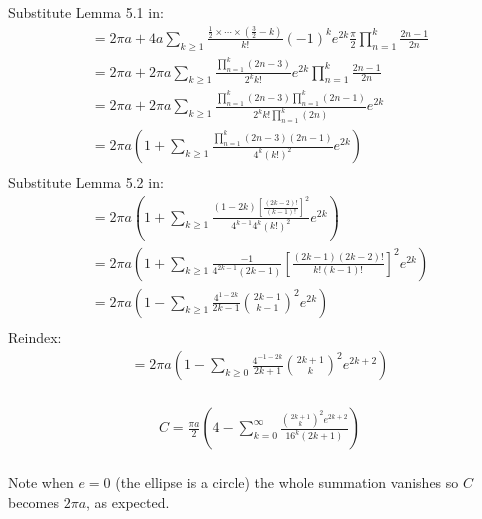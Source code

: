 \documentclass{article}
\begin{document}
Substitute Lemma 5.1 in:
\begin{equation*}
\begin{split}
	= 2\pi a + 4a\sum_{k\geq 1}\frac{\frac{1}{2}\times\cdots\times(\frac{3}{2}-k)}{k!}(-1)^ke^{2k}\frac{\pi}{2}\prod_{n=1}^k\frac{2n-1}{2n}\\
	= 2\pi a + 2\pi a\sum_{k\geq 1}\frac{\prod_{n=1}^k(2n-3)}{2^kk!}e^{2k}\prod_{n=1}^k\frac{2n-1}{2n}\\
	= 2\pi a + 2\pi a\sum_{k\geq 1}\frac{\prod_{n=1}^k(2n-3)\prod_{n=1}^k(2n-1)}{2^kk!\prod_{n=1}^k(2n)}e^{2k}\\
	= 2\pi a\left(1+\sum_{k\geq 1}\frac{\prod_{n=1}^k(2n-3)(2n-1)}{4^k(k!)^2}e^{2k}\right)\\
\end{split}
\end{equation*}
Substitute Lemma 5.2 in:
\begin{equation*}
\begin{split}
	= 2\pi a\left(1+\sum_{k\geq 1}\frac{(1-2k)\left[\frac{(2k-2)!}{(k-1)!}\right]^2}{4^{k-1}4^k(k!)^2}e^{2k}\right)\\
	= 2\pi a\left(1+\sum_{k\geq 1}\frac{-1}{4^{2k-1}(2k-1)}\left[\frac{(2k-1)(2k-2)!}{k!(k-1)!}\right]^2e^{2k}\right)\\
	= 2\pi a\left(1-\sum_{k\geq 1}\frac{4^{1-2k}}{2k-1}{{2k-1}\choose {k-1}}^2e^{2k}\right)\\
\end{split}
\end{equation*}
Reindex:
\begin{equation*}
\begin{split}
	= 2\pi a\left(1-\sum_{k\geq 0}\frac{4^{-1-2k}}{2k+1}{{2k+1}\choose k}^2e^{2k+2}\right)\\
\end{split}
\end{equation*}
\begin{tcolorbox}
\begin{equation}
\begin{split}
	C = \frac{\pi a}{2}\left(4-\sum_{k=0}^{\infty}\frac{{{2k+1}\choose k}^2e^{2k+2}}{16^k(2k+1)}\right)\\
\end{split}
\end{equation}
\end{tcolorbox}
Note when $e=0$ (the ellipse is a circle) the whole summation vanishes so $C$ becomes $2\pi a$, as expected.
\end{document}
